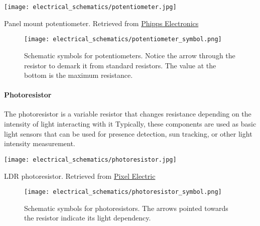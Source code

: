         \begin{marginfigure}[-2in]
            \texttt{[image: electrical\_schematics/potentiometer.jpg]}
            \caption{Panel mount potentiometer.
            Retrieved from \href{https://www.phippselectronics.com/product/10k-potentiometer-panel-mount-breadboard-friendly-pack-of-2/}{Phipps Electronics}}
        \end{marginfigure}

        \begin{figure}[h!]
            \texttt{[image: electrical\_schematics/potentiometer\_symbol.png]}
            \caption[Potentiometer Symbol]{Schematic symbols for potentiometers. Notice the arrow through the resistor to demark it from standard resistors. The value at the bottom is the maximum resistance.}
        \end{figure}

        \paragraph*{Photoresistor}
        The photoresistor is a variable resistor that changes resistance depending on the intensity of light interacting with it
        Typically, these components are used as basic light sensors that can be used for presence detection, sun tracking, or other light intensity measurement.

        \begin{marginfigure}[]
            \texttt{[image: electrical\_schematics/photoresistor.jpg]}
            \caption{LDR photoresistor.
            Retrieved from \href{https://www.pixelelectric.com/sensors/light-sound/light-color-sensor/5528-ldr-mini-photoresistor/}{Pixel Electric}}
        \end{marginfigure}

        \begin{figure}[h!]
            \texttt{[image: electrical\_schematics/photoresistor\_symbol.png]}
            \caption[Potentiometer Symbol]{Schematic symbols for photoresistors. The arrows pointed towards the resistor indicate its light dependency.}
        \end{figure}

